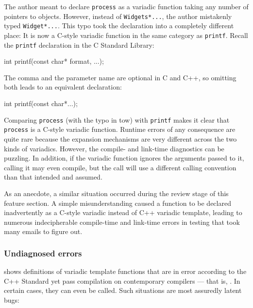\noindent The author meant to declare \lstinline!process! as a variadic function
taking any number of pointers to objects. However, instead of
\lstinline!Widgets*...!, the author mistakenly typed \lstinline!Widget*...!.
This typo took the declaration into a completely different place: It is
now a C-style variadic function in the same category as \lstinline!printf!.
Recall the \lstinline!printf! declaration in the C Standard Library:

\begin{emcppslisting}[emcppsbatch=e40]
int printf(const char* format, ...);
\end{emcppslisting}
    

\noindent The comma and the parameter name are optional in C and C++, so omitting
both leads to an equivalent declaration:

\begin{emcppslisting}[emcppsbatch=e40]
int printf(const char*...);
\end{emcppslisting}
    

\noindent Comparing \lstinline!process! (with the typo in tow) with \lstinline!printf!
makes it clear that \lstinline!process! is a C-style variadic function.
Runtime errors of any consequence are quite rare because the expansion
mechanisms are very different across the two kinds of variadics.
However, the compile- and link-time diagnostics can be puzzling. In
addition, if the variadic function ignores the arguments passed to it,
calling it may even compile, but the call will use a different calling
convention than that intended and assumed.

As an anecdote, a similar situation occurred during the review stage of
this feature section. A simple misunderstanding caused a function to be
declared inadvertently as a C-style variadic instead of C++ variadic
template, leading to numerous indecipherable compile-time and link-time
errors in testing that took many emails to figure out.

\subsubsection[Undiagnosed errors]{Undiagnosed errors}\label{undiagnosed-errors}

shows definitions of variadic template functions that are in error
according to the C++ Standard yet pass compilation on contemporary
compilers --- that is, . In certain cases, they can even
be called. Such situations are most assuredly latent bugs:

